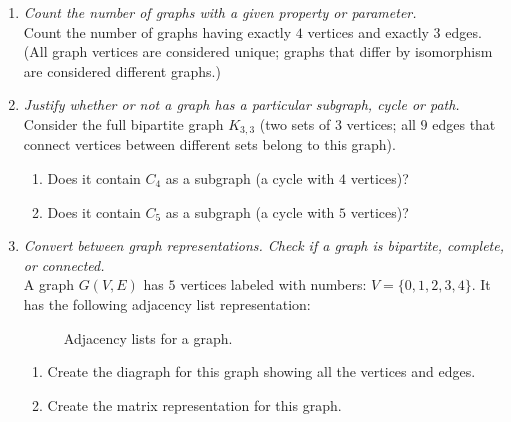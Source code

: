 \documentclass[a4paper,12pt]{article}
\begin{document}
\begin{enumerate}
\item {\small \em  Count the number of graphs with a given property or parameter.}\\
Count the number of graphs having exactly $4$ vertices and
exactly $3$ edges. (All graph vertices are considered unique; 
graphs that differ by isomorphism are considered different graphs.)

\item {\small \em  Justify whether or not a graph has a particular subgraph, cycle or path.}\\
Consider the full bipartite graph $K_{3,3}$ (two sets of $3$ vertices; all $9$ edges 
that connect vertices between different sets belong to this graph). 
\begin{enumerate}
\item Does it contain $C_4$ as a subgraph (a cycle with $4$ vertices)? 
\item Does it contain $C_5$ as a subgraph (a cycle with $5$ vertices)?
\end{enumerate}

\item {\small \em  Convert between graph representations.
Check if a graph is bipartite, complete, or connected. }\\
A graph $G(V,E)$ has $5$ vertices labeled with numbers: $V=\{ 0,1,2,3,4 \}$. 
It has the following adjacency list representation: 

\begin{figure}[!htb]
\caption{\label{fig:part2-graph-adjacency} Adjacency lists for a graph.}
\end{figure}

\begin{enumerate}
\item Create the diagraph for this graph showing all the vertices and edges.
\item Create the matrix representation for this graph.
\end{enumerate}



\end{enumerate}
\end{document}
